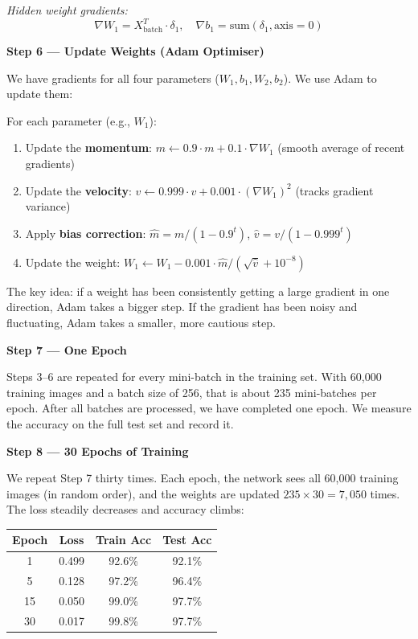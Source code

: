 \documentclass[12pt, a4paper]{article}
\begin{document}
\textit{Hidden weight gradients:}
\begin{equation}
  \nabla W_1 = X_{\text{batch}}^T \cdot \delta_1, \quad \nabla b_1 = \text{sum}(\delta_1, \text{axis}=0)
\end{equation}

\textbf{Step 6 --- Update Weights (Adam Optimiser)}

We have gradients for all four parameters ($W_1, b_1, W_2, b_2$). We use Adam to update them:

For each parameter (e.g., $W_1$):
\begin{enumerate}
  \item Update the \textbf{momentum}: $m \leftarrow 0.9 \cdot m + 0.1 \cdot \nabla W_1$ \quad (smooth average of recent gradients)
  \item Update the \textbf{velocity}: $v \leftarrow 0.999 \cdot v + 0.001 \cdot (\nabla W_1)^2$ \quad (tracks gradient variance)
  \item Apply \textbf{bias correction}: $\hat{m} = m / (1 - 0.9^t)$, $\hat{v} = v / (1 - 0.999^t)$
  \item Update the weight: $W_1 \leftarrow W_1 - 0.001 \cdot \hat{m} / (\sqrt{\hat{v}} + 10^{-8})$
\end{enumerate}

The key idea: if a weight has been consistently getting a large gradient in one direction, Adam takes a bigger step. If the gradient has been noisy and fluctuating, Adam takes a smaller, more cautious step.

\textbf{Step 7 --- One Epoch}

Steps 3--6 are repeated for every mini-batch in the training set. With 60,000 training images and a batch size of 256, that is about 235 mini-batches per epoch. After all batches are processed, we have completed one epoch. We measure the accuracy on the full test set and record it.

\textbf{Step 8 --- 30 Epochs of Training}

We repeat Step 7 thirty times. Each epoch, the network sees all 60,000 training images (in random order), and the weights are updated $235 \times 30 = 7,050$ times. The loss steadily decreases and accuracy climbs:

\begin{center}
\begin{tabular}{cccc}
  \toprule
  Epoch & Loss & Train Acc & Test Acc \\
  \midrule
  1  & 0.499 & 92.6\% & 92.1\% \\
  5  & 0.128 & 97.2\% & 96.4\% \\
  15 & 0.050 & 99.0\% & 97.7\% \\
  30 & 0.017 & 99.8\% & 97.7\% \\
  \bottomrule
\end{tabular}
\end{center}
\end{document}
